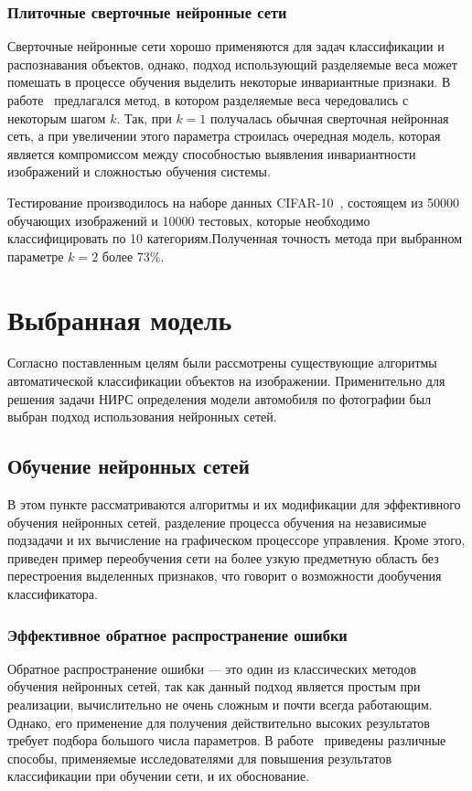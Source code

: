 \documentclass[a4paper,14pt]{extarticle} %
\begin{document}
\subsubsection{Плиточные сверточные нейронные сети}
\hspace{\parindent} Сверточные нейронные сети хорошо применяются для задач классификации и распознавания объектов, однако, подход использующий разделяемые веса может помешать в процессе обучения выделить некоторые инвариантные признаки. В работе~\cite{ngiam2010tiled} предлагался метод, в котором разделяемые веса чередовались с некоторым шагом $k$. Так, при $k=1$ получалась обычная сверточная нейронная сеть, а при увеличении этого параметра строилась очередная модель, которая является компромиссом между способностью выявления инвариантности изображений и сложностью обучения системы.

Тестирование производилось на наборе данных CIFAR-10~\cite{krizhevsky2009learning}, состоящем из 50000 обучающих изображений и 10000 тестовых, которые необходимо классифицировать по 10 категориям.Полученная точность метода при выбранном параметре $k=2$ более 73\%.

\section{Выбранная модель}
\hspace{\parindent} Согласно поставленным целям были рассмотрены существующие алгоритмы автоматической классификации объектов на изображении. Применительно для решения задачи НИРС определения модели автомобиля по фотографии был выбран подход использования нейронных сетей.

\subsection{Обучение нейронных сетей}
\hspace{\parindent} В этом пункте рассматриваются алгоритмы и их модификации для эффективного обучения нейронных сетей, разделение процесса обучения на независимые подзадачи и их вычисление на графическом процессоре управления. Кроме этого, приведен пример переобучения сети на более узкую предметную область без перестроения выделенных признаков, что говорит о возможности дообучения классификатора.

\subsubsection{Эффективное обратное распространение ошибки}
\hspace{\parindent} Обратное распространение ошибки --- это один из классических методов обучения нейронных сетей, так как данный подход является простым при реализации, вычислительно не очень сложным и почти всегда работающим. Однако, его применение для получения действительно высоких результатов требует подбора большого числа параметров. В работе~\cite{lecun2012efficient} приведены различные способы, применяемые исследователями для повышения результатов классификации при обучении сети, и их обоснование.
\end{document}
